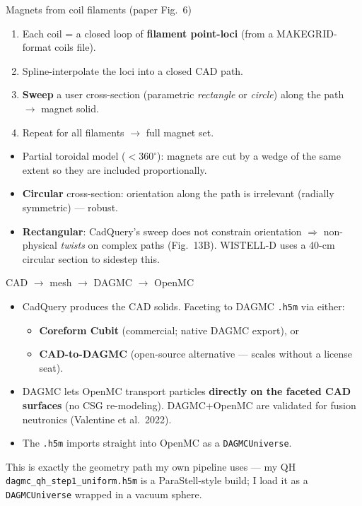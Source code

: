 \documentclass[aspectratio=169]{beamer}
\newcommand{\kb}[1]{\begin{tcolorbox}[colback=key!5,colframe=key!60,boxsep=2pt,left=4pt,right=4pt,top=3pt,bottom=3pt]#1\end{tcolorbox}}
\begin{document}
\begin{frame}{Magnets from coil filaments (paper Fig.~6)}
  \begin{enumerate}
    \item Each coil = a closed loop of \textbf{filament point-loci} (from a MAKEGRID-format coils file).
    \item Spline-interpolate the loci into a closed CAD path.
    \item \textbf{Sweep} a user cross-section (parametric \emph{rectangle} or \emph{circle}) along the path $\to$ magnet solid.
    \item Repeat for all filaments $\to$ full magnet set.
  \end{enumerate}
  \begin{itemize}\small
    \item Partial toroidal model ($<360^\circ$): magnets are cut by a wedge of the same extent so they are included proportionally.
    \item \textbf{Circular} cross-section: orientation along the path is irrelevant (radially symmetric) --- robust.
    \item \textbf{Rectangular}: CadQuery's sweep does not constrain orientation $\Rightarrow$ non-physical \emph{twists} on complex paths (Fig.~13B). WISTELL-D uses a 40-cm circular section to sidestep this.
  \end{itemize}
\end{frame}

\begin{frame}{CAD $\to$ mesh $\to$ DAGMC $\to$ OpenMC}
  \begin{itemize}
    \item CadQuery produces the CAD solids. Faceting to DAGMC \texttt{.h5m} via either:
      \begin{itemize}\small
        \item \textbf{Coreform Cubit} (commercial; native DAGMC export), or
        \item \textbf{CAD-to-DAGMC} (open-source alternative --- scales without a license seat).
      \end{itemize}
    \item DAGMC lets OpenMC transport particles \textbf{directly on the faceted CAD surfaces} (no CSG re-modeling). DAGMC+OpenMC are validated for fusion neutronics (Valentine et al.\ 2022).
    \item The \texttt{.h5m} imports straight into OpenMC as a \texttt{DAGMCUniverse}.
  \end{itemize}
  \kb{\footnotesize This is exactly the geometry path my own pipeline uses --- my QH \texttt{dagmc\_qh\_step1\_uniform.h5m} is a ParaStell-style build; I load it as a \texttt{DAGMCUniverse} wrapped in a vacuum sphere.}
\end{frame}
\end{document}
